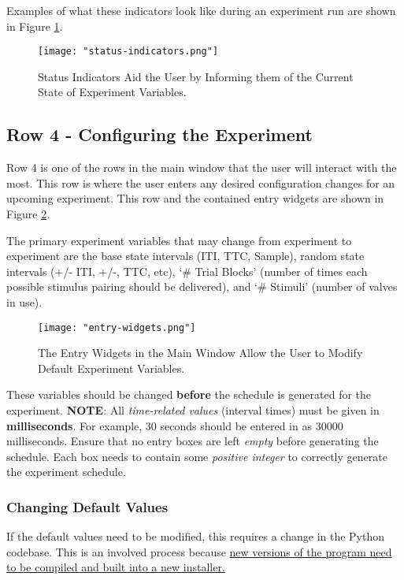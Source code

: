 \documentclass{article}
\begin{document}
Examples of what these indicators look like during an experiment run are shown in Figure \ref{fig:status-indicators}. 

\begin{figure}[h!]
        \centering
        \texttt{[image: "status-indicators.png"]}
        \caption{Status Indicators Aid the User by Informing them of the Current State of Experiment Variables.}
        \label{fig:status-indicators}
\end{figure}
\FloatBarrier

\newpage
\subsection{Row 4 - Configuring the Experiment}
\label{sec:basic-configuration}
Row 4 is one of the rows in the main window that the user will interact with the most. This row is where the user enters any desired configuration changes for an upcoming 
experiment. This row and the contained entry widgets are shown in Figure \ref{fig:entry-widgets}. 

The primary experiment variables that may change from experiment to 
experiment are the base state intervals (ITI, TTC, Sample), random state intervals (+/- ITI, +/-, TTC, etc), `\# Trial Blocks' 
(number of times each possible stimulus pairing should be delivered), and `\# Stimuli' (number of valves in use). 

\begin{figure}[h!]
        \centering
        \texttt{[image: "entry-widgets.png"]}
        \caption{The Entry Widgets in the Main Window Allow the User to Modify Default Experiment Variables.}
        \label{fig:entry-widgets}
\end{figure}
\FloatBarrier

These variables should be changed \textbf{before} the schedule is generated for the experiment. 
\newline
\newline
\textbf{NOTE}: All \textit{time-related values} (interval times) must be given in \textbf{milliseconds}. For example, 30 seconds should be 
entered in as 30000 milliseconds. 
\newline
\newline
Ensure that no entry boxes are left \textit{empty} before generating the schedule. Each box needs to 
contain some \textit{positive integer} to correctly generate the experiment schedule.

\newpage
\subsubsection{Changing Default Values}
If the default values need to be modified, this requires a change in the Python codebase. This is an involved process 
because \href{https://gist.github.com/blakehourigan/5e176f2600446a793547babff372299c}{new versions of the program need to be compiled and 
built into a new installer.}
\end{document}
